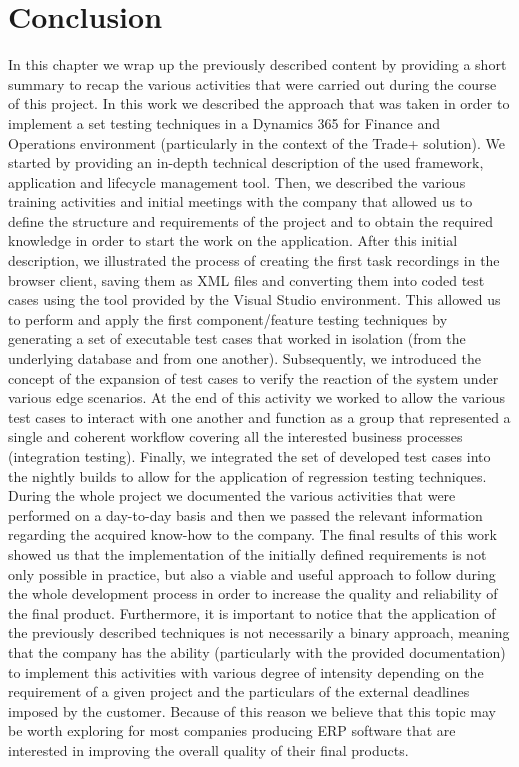 
\chapter{Conclusion}

In this chapter we wrap up the previously described content by providing a short summary to recap the various activities that were carried out during the course of this project. 
In this work we described the approach that was taken in order to implement a set testing techniques in a Dynamics 365 for Finance and Operations environment (particularly in the context of the Trade+ solution). 
We started by providing an in-depth technical description of the used framework, application and lifecycle management tool. 
Then, we described the various training activities and initial meetings with the company that allowed us to define the structure and requirements of the project and to obtain the required knowledge in order to start the work on the application. 
After this initial description, we illustrated the process of creating the first task recordings in the browser client, saving them as XML files and converting them into coded test cases using the tool provided by the Visual Studio environment. 
This allowed us to perform and apply the first component/feature testing techniques by generating a set of executable test cases that worked in isolation (from the underlying database and from one another). 
Subsequently, we introduced the concept of the expansion of test cases to verify the reaction of the system under various edge scenarios. At the end of this activity we worked to allow the various test cases to interact with one another and function as a group that represented a single and coherent workflow covering all the interested business processes (integration testing).  
Finally, we integrated the set of developed test cases into the nightly builds to allow for the application of regression testing techniques. 
During the whole project we documented the various activities that were performed on a day-to-day basis and then we passed the relevant information regarding the acquired know-how to the company. 
The final results of this work showed us that the implementation of the initially defined requirements is not only possible in practice, but also a viable and useful approach to follow during the whole development process in order to increase the quality and reliability of the final product. 
Furthermore, it is important to notice that the application of the previously described techniques is not necessarily a binary approach, meaning that the company has the ability (particularly with the provided documentation) to implement this activities with various degree of intensity depending on the requirement of a given project and the particulars of the external deadlines imposed by the customer. 
Because of this reason we believe that this topic may be worth exploring for most companies producing ERP software that are interested in improving the overall quality of their final products.


